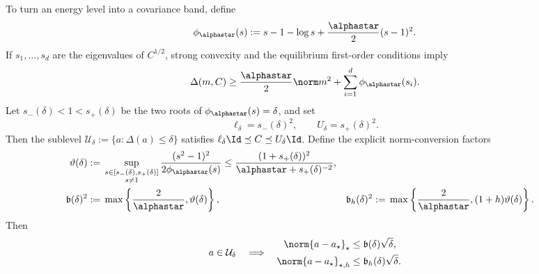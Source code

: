 To turn an energy level into a covariance band, define
\[
  \phi_{\alphastar}(s)
  :=s-1-\log s+\frac{\alphastar}{2}(s-1)^2.
\]
If \(s_1,\ldots,s_d\) are the eigenvalues of \(C^{1/2}\), strong convexity
and the equilibrium first-order conditions imply
\begin{equation}
  \Delta(m,C)
  \geq
  \frac{\alphastar}{2}\norm m^2+
  \sum_{i=1}^d\phi_{\alphastar}(s_i).
  \label{eq:local-entropy-coercivity}
\end{equation}
Let \(s_-(\delta)<1<s_+(\delta)\) be the two roots of
\(\phi_{\alphastar}(s)=\delta\), and set
\[
  \ell_\delta=s_-(\delta)^2,\qquad
  U_\delta=s_+(\delta)^2.
\]
Then the sublevel
\(\mathcal U_\delta:=\{a:\Delta(a)\leq\delta\}\) satisfies
\(\ell_\delta\Id\preceq C\preceq U_\delta\Id\).
Define the explicit norm-conversion factors
\begin{align}
  \vartheta(\delta)
  &:={}
  \sup_{\substack{s\in[s_-(\delta),s_+(\delta)]\\s\neq1}}
  \frac{(s^2-1)^2}{2\phi_{\alphastar}(s)}
  \leq
  \frac{(1+s_+(\delta))^2}
       {\alphastar+s_+(\delta)^{-2}},
  \label{eq:local-vartheta}\\
  \mathfrak b(\delta)^2
  &:={}
  \max\left\{\frac2{\alphastar},\vartheta(\delta)\right\},
  &
  \mathfrak b_h(\delta)^2
  &:={}
  \max\left\{\frac2{\alphastar},(1+h)\vartheta(\delta)\right\}.
  \label{eq:local-b-factors}
\end{align}
Then
\begin{equation}
  a\in\mathcal U_\delta
  \quad\Longrightarrow\quad
  \begin{aligned}
    \norm{a-a_\star}_\star
    &\leq\mathfrak b(\delta)\sqrt\delta,\\
    \norm{a-a_\star}_{\star,h}
    &\leq\mathfrak b_h(\delta)\sqrt\delta.
  \end{aligned}
  \label{eq:local-norm-conversion}
\end{equation}

